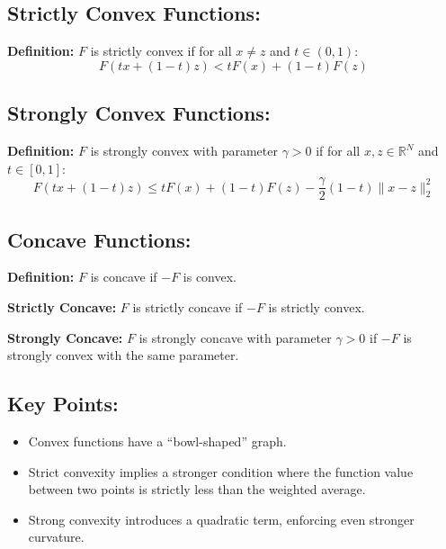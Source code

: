 \documentclass{article}
\begin{document}
\subsection*{Strictly Convex Functions:}

\textbf{Definition:} \( F \) is strictly convex if for all \( x \neq z \) and \( t \in (0,1) \):
\[
F(tx + (1 - t)z) < tF(x) + (1 - t)F(z)
\]

\subsection*{Strongly Convex Functions:}

\textbf{Definition:} \( F \) is strongly convex with parameter \( \gamma > 0 \) if for all \( x, z \in \mathbb{R}^N \) and \( t \in [0, 1] \):
\[
F(tx + (1 - t)z) \leq tF(x) + (1 - t)F(z) - \frac{\gamma}{2}(1 - t)\|x - z\|_2^2
\]

\subsection*{Concave Functions:}

\textbf{Definition:} \( F \) is concave if \( -F \) is convex.

\textbf{Strictly Concave:} \( F \) is strictly concave if \( -F \) is strictly convex.

\textbf{Strongly Concave:} \( F \) is strongly concave with parameter \( \gamma > 0 \) if \( -F \) is strongly convex with the same parameter.

\subsection*{Key Points:}

\begin{itemize}
    \item Convex functions have a ``bowl-shaped'' graph.
    \item Strict convexity implies a stronger condition where the function value between two points is strictly less than the weighted average.
    \item Strong convexity introduces a quadratic term, enforcing even stronger curvature.
\end{itemize}
\end{document}
